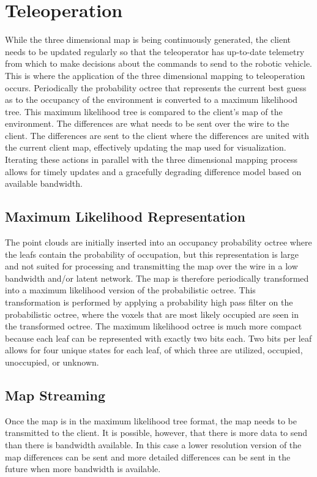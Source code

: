 \documentclass[12pt]{report}
\begin{document}
\chapter{Teleoperation}\label{chap:teleoperation}
While the three dimensional map is being continuously generated, the client needs to be updated regularly so that the teleoperator has up-to-date telemetry from which to make decisions about the commands to send to the robotic vehicle. This is where the application of the three dimensional mapping to teleoperation occurs. Periodically the probability octree that represents the current best guess as to the occupancy of the environment is converted to a maximum likelihood tree.  This maximum likelihood tree is compared to the client's map of the environment.  The differences are what needs to be sent over the wire to the client.  The differences are sent to the client where the differences are united with the current client map, effectively updating the map used for visualization.  Iterating these actions in parallel with the three dimensional mapping process allows for timely updates and a gracefully degrading difference model based on available bandwidth.

\section{Maximum Likelihood Representation}
The point clouds are initially inserted into an occupancy probability octree where the leafs contain the probability of occupation, but this representation is large and not suited for processing and transmitting the map over the wire in a low bandwidth and/or latent network. The map is therefore periodically transformed into a maximum likelihood version of the probabilistic octree. This transformation is performed by applying a probability high pass filter on the probabilistic octree, where the voxels that are most likely occupied are seen in the transformed octree. The maximum likelihood octree is much more compact because each leaf can be represented with exactly two bits each\cite{octomap}.  Two bits per leaf allows for four unique states for each leaf, of which three are utilized, occupied, unoccupied, or unknown.

\section{Map Streaming}
Once the map is in the maximum likelihood tree format, the map needs to be transmitted to the client. It is possible, however, that there is more data to send than there is bandwidth available. In this case a lower resolution version of the map differences can be sent and more detailed differences can be sent in the future when more bandwidth is available.
\end{document}
